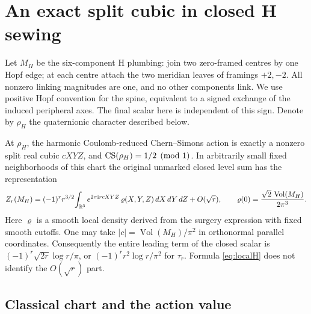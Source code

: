 \section{An exact split cubic in closed H sewing}\label{sec:H}

Let \(M_H\) be the six-component H plumbing: join two zero-framed centres by one Hopf edge; at each centre attach the two meridian leaves of framings \(+2,-2\). All nonzero linking magnitudes are one, and no other components link. We use positive Hopf convention for the spine, equivalent to a signed exchange of the induced peripheral axes. The final scalar here is independent of this sign. Denote by \(\rho_H\) the quaternionic character described below.

\begin{theorem}\label{thm:H}
At \(\rho_H\), the harmonic Coulomb-reduced Chern--Simons action is exactly a nonzero split real cubic \(cXYZ\), and \(\operatorname{CS}(\rho_H)=1/2\pmod1\). In arbitrarily small fixed neighborhoods of this chart the original unmarked closed level sum has the representation
\begin{equation}\label{eq:localH}
 Z_r(M_H)=(-1)^r r^{3/2}\!
   \int_{\mathbb R^3} e^{2\pi\mathrm i r cXYZ}\,\varrho(X,Y,Z)\,dX\,dY\,dZ
     +O(\sqrt r),
 \qquad \varrho(0)=\frac{\sqrt2\,\operatorname{Vol}(M_H)}{2\pi^3}.
\end{equation}
Here \(\varrho\) is a smooth local density derived from the surgery expression with fixed smooth cutoffs. One may take \(|c|=\operatorname{Vol}(M_H)/\pi^2\) in orthonormal parallel coordinates. Consequently the entire leading term of the closed scalar is \((-1)^r\sqrt{2r}\log r/\pi\), or \((-1)^r r^2\log r/\pi^2\) for \(\tau_r\). Formula \eqref{eq:localH} does not identify the \(O(\sqrt r)\) part.
\end{theorem}

\subsection{Classical chart and the action value}

